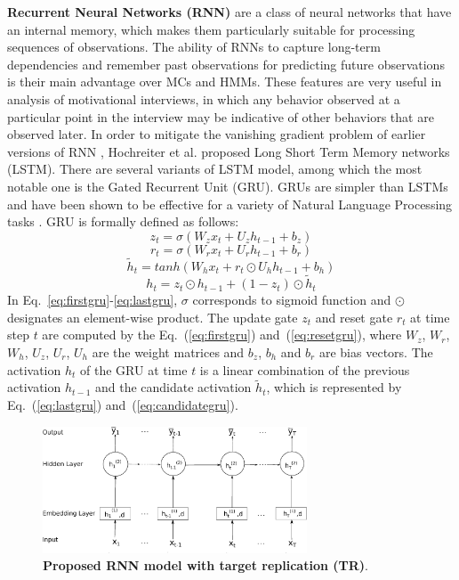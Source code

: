 \documentclass{amia_summit_2018}
\begin{document}
\textbf {Recurrent Neural Networks (RNN)} are a class of neural networks that have an internal memory, which makes them particularly suitable for processing sequences of observations. The ability of RNNs to capture long-term dependencies and remember past observations for predicting future observations is their main advantage over MCs and HMMs. These features are very useful in analysis of motivational interviews, in which any behavior observed at a particular point in the interview may be indicative of other behaviors that are observed later. In order to mitigate the vanishing gradient problem of earlier versions of RNN \cite{bengio1993problem}, Hochreiter et al.\cite{hochreiter1997long} proposed Long Short Term Memory networks (LSTM). There are several variants of LSTM model, among which the most notable one is the Gated Recurrent Unit\cite{cho2014properties} (GRU). GRUs are simpler than LSTMs and have been shown to be effective for a variety of Natural Language Processing tasks \cite{cho2014properties}. GRU is formally defined as follows:
\begin{equation}
z_t = \sigma(W_zx_t + U_zh_{t-1} + b_z)
\label{eq:firstgru}
\end{equation}
\begin{equation}
r_t = \sigma(W_rx_t + U_rh_{t-1} + b_r)
\label{eq:resetgru}
\end{equation}
\begin{equation}
\tilde h_t = tanh(W_hx_t + r_t \odot U_hh_{t-1} + b_h) 
\label{eq:candidategru}
\end{equation}
\begin{equation}
h_t = z_t \odot h_{t-1} + (1-z_t) \odot \tilde h_t
\label{eq:lastgru}
\end{equation}  
In Eq.~\ref{eq:firstgru}-\ref{eq:lastgru}, $\sigma$ corresponds to sigmoid function and $\odot$ designates an element-wise product. The update gate $z_t$ and reset gate $r_t$ at time step $t$ are computed by the Eq.~(\ref{eq:firstgru}) and~(\ref{eq:resetgru}), where $W_z$, $W_r$, $W_h$, $U_z$, $U_r$, $U_h$ are the weight matrices and $b_z$, $b_h$ and $b_r$ are bias vectors. The activation $h_t$ of the GRU at time $t$ is a linear combination of the previous activation $h_{t-1}$ and the candidate activation $\tilde h_t$, which is represented by Eq.~(\ref{eq:lastgru}) and~(\ref{eq:candidategru}).
  
\begin{figure}[!htb]
    \centering
    \includegraphics[width=0.70\textwidth]{figures/rnn_small.eps}
    \caption{\textbf{Proposed RNN model with target replication (TR)}.}
    \label{fig:rnn-model}
\end{figure}
\end{document}
